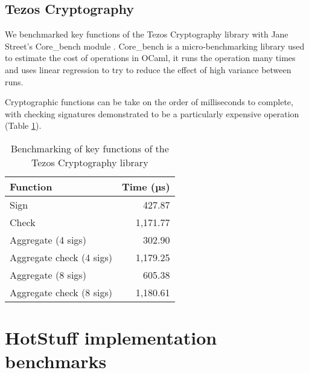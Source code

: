 \subsection{Tezos Cryptography} \label{tezosbenchmark}
We benchmarked key functions of the Tezos Cryptography library \cite{tezosCrypto} with Jane Street's Core\_bench module \cite{janestreetCoreBench2023}. Core\_bench is a micro-benchmarking library used to estimate the cost of operations in OCaml, it runs the operation many times and uses linear regression to try to reduce the effect of high variance between runs.

Cryptographic functions can be take on the order of milliseconds to complete, with checking signatures demonstrated to be a particularly expensive operation (Table \ref{tezostable}).

\begin{table}[!h]
	\centering
	\begin{tabular}{|l|r|}
	\hline
	Function                 & Time (µs) \\ \hline
	Sign                     & 427.87   \\
	Check                    & 1,171.77 \\
	Aggregate (4 sigs)       & 302.90   \\
	Aggregate check (4 sigs) & 1,179.25 \\
	Aggregate (8 sigs)       & 605.38   \\
	Aggregate check (8 sigs) & 1,180.61 \\ \hline
	\end{tabular}
	\caption{Benchmarking of key functions of the Tezos Cryptography library}
	\label{tezostable}
\end{table}

\section{HotStuff implementation benchmarks} \label{hotstuffbenchmarks}


